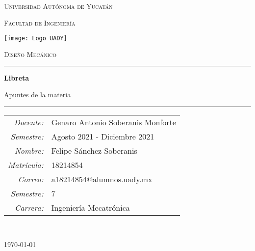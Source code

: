 \documentclass[Libreta.tex]{subfiles}
\begin{document}
\thispagestyle{empty}
\setcounter{page}{0}

{
    \centering
    \setlength{\parindent}{0pt}

    {\LARGE\textsc{Universidad Autónoma de Yucatán}\\}

    {\large\textsc{Facultad de Ingeniería}\\}

    \vspace{2em}

    \texttt{[image: Logo UADY]}

    \vspace{1em}

    {\Large\textsc{Diseño Mecánico}\\}

    \vspace{1em}

    \rule{\textwidth}{1pt}

    {\LARGE\textbf{Libreta}\\}

    {\large Apuntes de la materia\\}

    \rule{\textwidth}{1pt}

    \vspace{3em}

    {
        \raggedright
        \begin{tabular}{r l}
            \textit{Docente:} & Genaro Antonio Soberanis Monforte  \\

            \textit{Semestre:} & Agosto 2021 - Diciembre 2021 \\

            \textit{Nombre:} & Felipe Sánchez Soberanis \\

            \textit{Matrícula:} & 18214854 \\

            \textit{Correo:} & a18214854@alumnos.uady.mx \\

            \textit{Semestre:} & 7 \\

            \textit{Carrera:} & Ingeniería Mecatrónica
        \end{tabular}
    \\}

    \vfill

    {
        \raggedleft
        \today
    \\}
}
\end{document}
